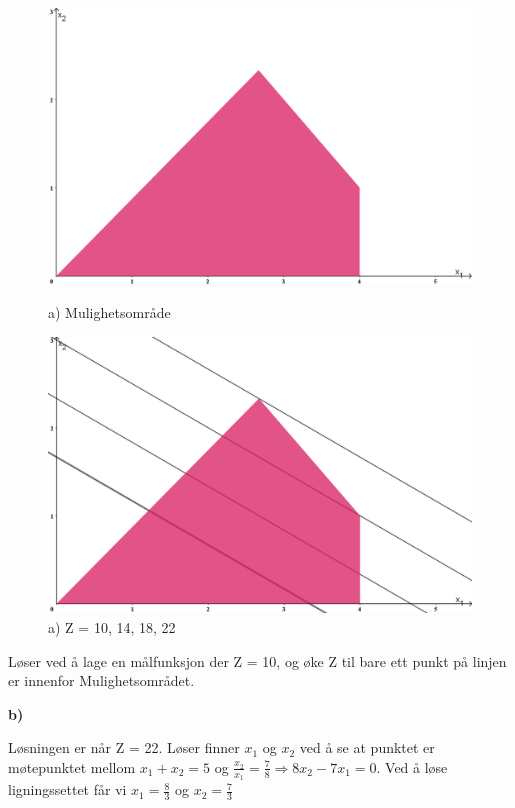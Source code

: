 \documentclass{article}
\begin{document}
    \begin{figure}[ht]
        \centering
        \begin{minipage}{0.45\textwidth}
            \includegraphics[width=\linewidth]{img/2a.PNG}
            \caption{a) Mulighetsområde}
        \end{minipage}
        \begin{minipage}{0.45\textwidth}
            \includegraphics[width=\linewidth]{img/2b.PNG}
            \caption{a) Z = 10, 14, 18, 22}
        \end{minipage}
    \end{figure}
    
    Løser ved å lage en målfunksjon der Z = 10, og øke Z til bare ett punkt på linjen er innenfor Mulighetsområdet.
    
    \small\textbf{b)}
    
    Løsningen er når Z = 22. Løser finner $x_1$ og $x_2$ ved å se at punktet er møtepunktet mellom $x_1 + x_2 = 5$ og $\frac{x_2}{x_1} = \frac{7}{8} \Rightarrow 8x_2 - 7x_1 = 0$. 
    Ved å løse ligningssettet får vi $x_1 = \frac{8}{3}$ og $x_2 = \frac{7}{3} $
    
\end{document}
